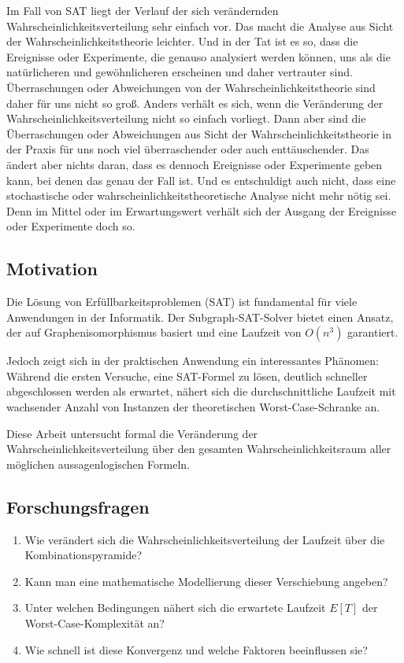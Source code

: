 ﻿\documentclass[a4paper,12pt]{article}
\theoremstyle{definition}
\begin{document}
Im Fall von SAT liegt der Verlauf der sich verändernden Wahrscheinlichkeitsverteilung sehr einfach vor. Das macht die Analyse aus Sicht der Wahrscheinlichkeitstheorie leichter. Und in der Tat ist es so, dass die Ereignisse oder Experimente, die genauso analysiert werden können, uns als die natürlicheren und gewöhnlicheren erscheinen und daher vertrauter sind. Überraschungen oder Abweichungen von der Wahrscheinlichkeitstheorie sind daher für uns nicht so groß. Anders verhält es sich, wenn die Veränderung der Wahrscheinlichkeitsverteilung nicht so einfach vorliegt. Dann aber sind die Überraschungen oder Abweichungen aus Sicht der Wahrscheinlichkeitstheorie in der Praxis für uns noch viel überraschender oder auch enttäuschender. Das ändert aber nichts daran, dass es dennoch Ereignisse oder Experimente geben kann, bei denen das genau der Fall ist. Und es entschuldigt auch nicht, dass eine stochastische oder wahrscheinlichkeitstheoretische Analyse nicht mehr nötig sei. Denn im Mittel oder im Erwartungswert verhält sich der Ausgang der Ereignisse oder Experimente doch so.

\subsection{Motivation}

Die Lösung von Erfüllbarkeitsproblemen (SAT) ist fundamental für viele Anwendungen in der Informatik. Der Subgraph-SAT-Solver bietet einen Ansatz, der auf Graphenisomorphismus basiert und eine Laufzeit von $O(n^3)$ garantiert.

Jedoch zeigt sich in der praktischen Anwendung ein interessantes Phänomen: Während die ersten Versuche, eine SAT-Formel zu lösen, deutlich schneller abgeschlossen werden als erwartet, nähert sich die durchschnittliche Laufzeit mit wachsender Anzahl von Instanzen der theoretischen Worst-Case-Schranke an.

Diese Arbeit untersucht formal die Veränderung der Wahrscheinlichkeitsverteilung über den gesamten Wahrscheinlichkeitsraum aller möglichen aussagenlogischen Formeln.

\subsection{Forschungsfragen}

\begin{enumerate}
	\item Wie verändert sich die Wahrscheinlichkeitsverteilung der Laufzeit über die Kombinationspyramide?
	\item Kann man eine mathematische Modellierung dieser Verschiebung angeben?
	\item Unter welchen Bedingungen nähert sich die erwartete Laufzeit $E[T]$ der Worst-Case-Komplexität an?
	\item Wie schnell ist diese Konvergenz und welche Faktoren beeinflussen sie?
\end{enumerate}
\end{document}
